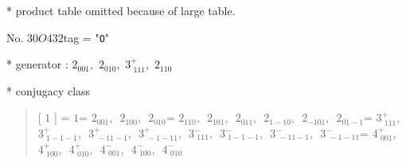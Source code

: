 \documentclass[fleqn,10pt,landscape]{jsarticle}
\begin{document}
* product table
\quad\quad omitted because of large table.

\newpage

No. 30\quad$O$\quad$432$\quad[ cubic ]
tag = "{\tt O}"

* generator : $2{}_{001},\,\,2{}_{010},\,\,3^{+}_{\,\,111},\,\,2{}_{110}$

* conjugacy class
\begin{quote}
[ $1$ ] = \quad $1$\newline[ $2{}_{001}$ ] = \quad $2{}_{001}$,\,\, $2{}_{100}$,\,\, $2{}_{010}$\newline[ $2{}_{110}$ ] = \quad $2{}_{110}$,\,\, $2{}_{101}$,\,\, $2{}_{011}$,\,\, $2{}_{1-10}$,\,\, $2{}_{-101}$,\,\, $2{}_{01-1}$\newline[ $3^{+}_{\,\,111}$ ] = \quad $3^{+}_{\,\,111}$,\,\, $3^{+}_{\,\,1-1-1}$,\,\, $3^{+}_{\,\,-11-1}$,\,\, $3^{+}_{\,\,-1-11}$,\,\, $3^{-}_{\,\,111}$,\,\, $3^{-}_{\,\,1-1-1}$,\,\, $3^{-}_{\,\,-11-1}$,\,\, $3^{-}_{\,\,-1-11}$\newline[ $4^{+}_{\,\,001}$ ] = \quad $4^{+}_{\,\,001}$,\,\, $4^{+}_{\,\,100}$,\,\, $4^{+}_{\,\,010}$,\,\, $4^{-}_{\,\,001}$,\,\, $4^{-}_{\,\,100}$,\,\, $4^{-}_{\,\,010}$\newline
\end{quote}
\end{document}
